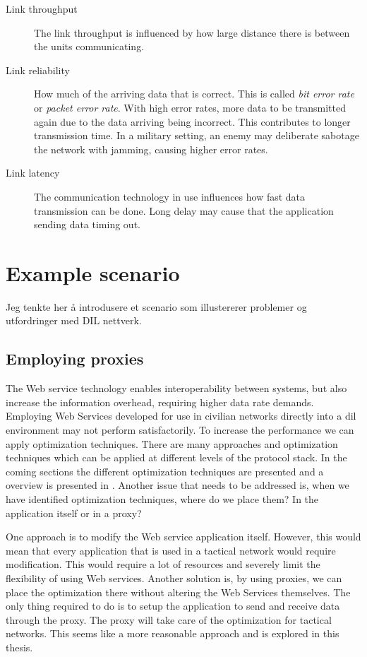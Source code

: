 \begin{description}

\item[Link throughput] The link throughput is influenced by how large distance
there is between the units communicating.

\item[Link reliability] How much of the arriving data that is correct. This is
called \textit{bit error rate} or \textit{packet error rate}. With high error
rates, more data to be transmitted again due to the data arriving being
incorrect. This contributes to longer transmission time. In a military setting,
an enemy may deliberate sabotage the network with jamming, causing higher error
rates.

\item[Link latency] The communication technology in use influences how fast data
transmission can be done. Long delay may cause that the application sending data
timing out.

\end{description}


\section{Example scenario}

Jeg tenkte her å introdusere et scenario som illustererer problemer og utfordringer
med DIL nettverk.


\subsection{Employing proxies}

The Web service technology enables interoperability between systems, but also
increase the information overhead, requiring higher data rate demands. Employing
Web Services developed for use in civilian networks directly into a \gls{dil}
environment may not perform satisfactorily. To increase the performance we can
apply optimization techniques. There are many approaches and optimization
techniques which can be applied at different levels of the protocol stack. In
the coming sections the different optimization techniques are presented and a
overview is presented in . Another issue
that needs to be addressed is, when we have identified optimization techniques,
where do we place them? In the application itself or in a proxy?

One approach is to modify the Web service application itself. However, this
would mean that every application that is used in a tactical network would
require modification. This would require a lot of resources and severely limit
the flexibility of using Web services. Another solution is, by using proxies, we
can place the optimization there without altering the Web Services themselves.
The only thing required to do is to setup the application to send and receive
data through the proxy. The proxy will take care of the optimization for
tactical networks. This seems like a more reasonable approach and is explored in
this thesis.



